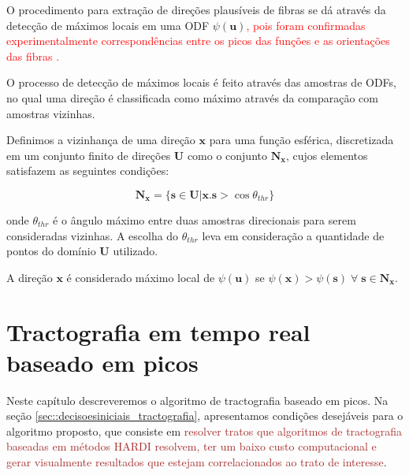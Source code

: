 \documentclass[
    12pt,                %
    oneside,            %
    a4paper,            %
    english,            %
    french,                %
    spanish,            %
    brazil                %
    ]{abntex2}
\begin{document}

O procedimento para extração de direções plausíveis de fibras se dá através da detecção de máximos locais em uma ODF $\psi(\mathbf{u})$\textcolor{red}{, pois foram confirmadas experimentalmente correspondências entre os picos das funções e as orientações das fibras .}

O processo de detecção de máximos locais é feito através das amostras de ODFs, no qual uma direção é classificada como máximo através da comparação com amostras vizinhas.


Definimos a vizinhança de uma direção $\mathbf{x}$ para uma função esférica, discretizada em um conjunto finito de direções $\mathbf{U}$ como o conjunto $\mathbf{N_x}$, cujos elementos satisfazem as seguintes condições:


\begin{equation}
\label{eq::neighboorhood}
    \mathbf{N_x} = \{\mathbf{s} \in \mathbf{U}  | \mathbf{x}.\mathbf{s} > \cos{\theta_{thr}} \}
\end{equation}

onde $\theta_{thr}$ é o ângulo máximo entre duas amostras direcionais para serem consideradas vizinhas. A escolha do $\theta_{thr}$ leva em consideração a quantidade de pontos do domínio $\mathbf{U}$ utilizado.

A direção $\mathbf{x}$ é considerado máximo local de $\psi(\mathbf{u})$ se $\psi(\mathbf{x}) > \psi(\mathbf{s}) \; \forall \; \mathbf{s} \in \mathbf{N_x}$.



\chapter{Tractografia em tempo real baseado em picos}

Neste capítulo descreveremos o algoritmo de tractografia baseado em picos. Na seção \ref{sec::decisoesiniciais_tractografia}, apresentamos condições desejáveis para o algoritmo proposto, que consiste em \textcolor{brown}{resolver tratos que algoritmos de tractografia baseadas em métodos HARDI resolvem, ter um baixo custo computacional e gerar visualmente resultados que estejam correlacionados ao trato de interesse}.
\end{document}
